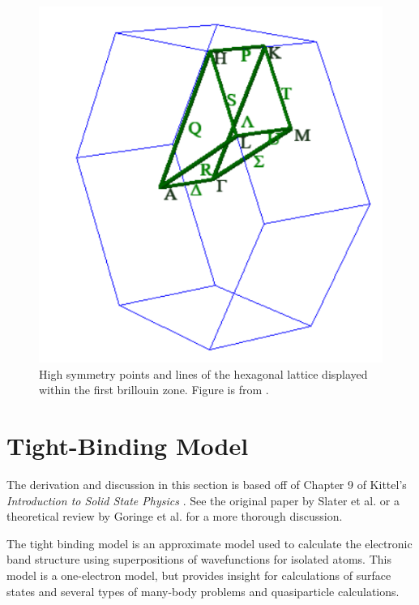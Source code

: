 \documentclass[]{article}
\begin{document}
\begin{figure}[htb]
	\centering
	\includegraphics[scale = 0.7]{high_symmetry_points_hexagonal_lattice.PNG}
	\caption{High symmetry points and lines of the hexagonal lattice displayed within the first brillouin zone. Figure is from \cite{FBZ_symmetry_website}.}
	\label{fig: High_symmetry_points}
\end{figure}


\section{Tight-Binding Model}\label{sec: Tight Bonding}

The derivation and discussion in this section is based off of Chapter 9 of Kittel's \textit{Introduction to Solid State Physics} \cite{Kittel_SolidStatePhysics}. See the original paper by Slater et al. \cite{Original_Tight_Binding_Paper} or a theoretical review by Goringe et al. \cite{Tight_binding_theory_1997_Paper} for a more thorough discussion. 
\newline

The tight binding model is an approximate model used to calculate the electronic band structure using superpositions of wavefunctions for isolated atoms. This model is a one-electron model, but provides insight for calculations of surface states and several types of many-body problems and quasiparticle calculations. 
\newline
\end{document}
